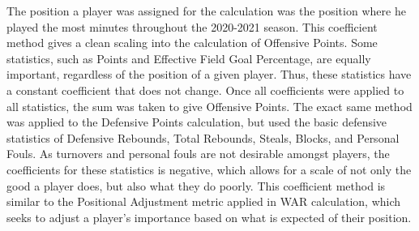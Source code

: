 \documentclass[12pt]{article}
\begin{document}
The position a player was assigned for the calculation was the position where he played the most minutes 
throughout the 2020-2021 season. This coefficient method gives a clean scaling into the calculation of 
Offensive Points. Some statistics, such as Points and Effective Field Goal Percentage, are equally 
important, regardless of the position of a given player. Thus, these statistics have a constant coefficient that 
does not change. Once all coefficients were applied to all statistics, the sum was taken to give Offensive 
Points. The exact same method was applied to the Defensive Points calculation, but used the basic 
defensive statistics of Defensive Rebounds, Total Rebounds, Steals, Blocks, and Personal Fouls. As 
turnovers and personal fouls are not desirable amongst players, the coefficients for these statistics is 
negative, which allows for a scale of not only the good a player does, but also what they do poorly. This 
coefficient method is similar to the Positional Adjustment metric applied in WAR calculation, which seeks to 
adjust a player's importance based on what is expected of their position.
\end{document}

